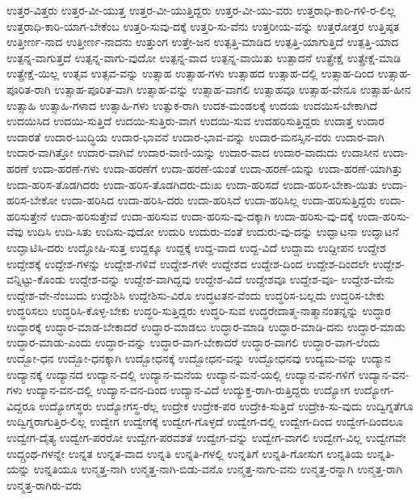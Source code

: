 {ಉತ್ತರ-ವಿತ್ತರು
ಉತ್ತರ-ವೀ-ಯುತ್ತ
ಉತ್ತರ-ವೀ-ಯುತ್ತಿದ್ದರು
ಉತ್ತರ-ವೀ-ಯು-ವರು
ಉತ್ತರಾಧಿ-ಕಾರಿ-ಗಳಿ-ರ-ಲಿಲ್ಲ
ಉತ್ತರಾಧಿ-ಕಾರಿ-ಯಾಗ-ಬೇಕೆಂಬ
ಉತ್ತರಿ-ಸುವು-ದಕ್ಕೆ
ಉತ್ತರಿ-ಸು-ವೆನು
ಉತ್ತರೀಯ-ವನ್ನು
ಉತ್ತರೋತ್ತರ
ಉತ್ತಿಷ್ಠತ
ಉತ್ತೀರ್ಣ-ನಾದ
ಉತ್ತೀರ್ಣ-ನಾದನು
ಉತ್ತುಂಗ
ಉತ್ತೇ-ಜನ
ಉತ್ಪತ್ತಿ-ಮಾಡಿದ
ಉತ್ಪತ್ತಿ-ಯಾಗುತ್ತಿದೆ
ಉತ್ಪತ್ತಿ-ಯಾದ
ಉತ್ಪನ್ನ-ವಾಗುತ್ತದೆ
ಉತ್ಪನ್ನ-ವಾಗು-ವುದೋ
ಉತ್ಪನ್ನ-ವಾದ
ಉತ್ಪನ್ನ-ವಾಯಿತು
ಉತ್ಪಾದನೆ
ಉತ್ಪ್ರೇಕ್ಷೆ
ಉತ್ಪ್ರೇಕ್ಷೆ-ಮಾಡಿ
ಉತ್ಪ್ರೇಕ್ಷೆ-ಯಿಲ್ಲ
ಉತ್ಸವ
ಉತ್ಸವ-ವನ್ನು
ಉತ್ಸಾಹ
ಉತ್ಸಾಹ-ಗಳು
ಉತ್ಸಾಹದ
ಉತ್ಸಾಹ-ದಲ್ಲಿ
ಉತ್ಸಾಹ-ದಿಂದ
ಉತ್ಸಾಹ-ಪೂರಿತ-ರಾಗಿ
ಉತ್ಸಾಹ-ಪೂರಿತ-ವಾಗಿ
ಉತ್ಸಾಹ-ವನ್ನು
ಉತ್ಸಾಹ-ವಾಗಲಿ
ಉತ್ಸಾಹವೂ
ಉತ್ಸಾಹ-ವೇನೂ
ಉತ್ಸಾಹ-ಹೀನ
ಉತ್ಸಾಹಿ
ಉತ್ಸಾಹಿ-ಗಳಾದ
ಉತ್ಸಾಹಿ-ಗಳು
ಉತ್ಸುಕ-ರಾಗಿ
ಉದಕ-ಮಂಡಲಕ್ಕೆ
ಉದಯ
ಉದಯಿಸ-ಬೇಕಾಗಿದೆ
ಉದಯಿಸಿದ
ಉದಯಿ-ಸುತ್ತಿದೆ
ಉದಯಿ-ಸುತ್ತಿರು-ವಾಗ
ಉದಯಿ-ಸುವ
ಉದಹರಿಸುತ್ತಿದ್ದರು
ಉದಾತ್ತ
ಉದಾರ
ಉದಾರತೆ
ಉದಾರ-ಬುದ್ಧಿಯ
ಉದಾರ-ಭಾವನೆ
ಉದಾರ-ಭಾವ-ವನ್ನು
ಉದಾರ-ಮನಸ್ಸಿನ-ವರು
ಉದಾರ-ವಾಗಿ
ಉದಾರ-ವಾಗಿತ್ತೋ
ಉದಾರ-ವಾಗಿವೆ
ಉದಾರ-ವಾಣಿ-ಯನ್ನು
ಉದಾರ-ವಾದ
ಉದಾರ-ವಾದುದು
ಉದಾಸೀನ
ಉದಾ-ಹರಣೆ
ಉದಾ-ಹರಣೆ-ಗಳು
ಉದಾ-ಹರಣೆಗೆ
ಉದಾ-ಹರಣೆ-ಯಂತೆ
ಉದಾ-ಹರಣೆ-ಯನ್ನು
ಉದಾ-ಹರಣೆ-ಯಾಗಿತ್ತು
ಉದಾ-ಹರಿಸ-ತೊಡಗಿದರು
ಉದಾ-ಹರಿಸ-ತೊಡಗಿದರು-ದುಃಖ
ಉದಾ-ಹರಿಸದೆ
ಉದಾ-ಹರಿಸ-ಬೇಕಾ-ಯಿತು
ಉದಾ-ಹರಿಸ-ಬೇಕೋ
ಉದಾ-ಹರಿಸಿದ
ಉದಾ-ಹರಿಸಿ-ದರು
ಉದಾ-ಹರಿಸಿದೆ
ಉದಾ-ಹರಿಸಿಲ್ಲ
ಉದಾ-ಹರಿಸುತ್ತಿದ್ದರು
ಉದಾ-ಹರಿಸುತ್ತೇನೆ
ಉದಾ-ಹರಿಸುತ್ತೇವೆ
ಉದಾ-ಹರಿಸುವ
ಉದಾ-ಹರಿಸು-ವು-ದಕ್ಕಾಗಿ
ಉದಾ-ಹರಿಸು-ವು-ದಕ್ಕೆ
ಉದಾ-ಹರಿಸು-ವೆವು
ಉದಿಸಿ
ಉದಿ-ಸಿತು
ಉದಿಸು-ವುದೋ
ಉದುರಿ
ಉದುರು-ವಂತೆ
ಉದುರು-ವು-ದನ್ನು
ಉದ್ಘಾಟನಾ
ಉದ್ಘಾಟನೆ
ಉದ್ಘಾಟಿಸಿ-ದರು
ಉದ್ಘೋಷಿ-ಸುತ್ತ
ಉದ್ದಕ್ಕೂ
ಉದ್ದಕ್ಕೆ
ಉದ್ದ-ವಾದ
ಉದ್ದ-ವಿದೆ
ಉದ್ದಾಮ
ಉದ್ದೀಪನ
ಉದ್ದೇಶ
ಉದ್ದೇಶಕ್ಕೆ
ಉದ್ದೇಶ-ಗಳನ್ನು
ಉದ್ದೇಶ-ಗಳಿವೆ
ಉದ್ದೇಶ-ಗಳೇ
ಉದ್ದೇಶದ
ಉದ್ದೇಶ-ದಿಂದ
ಉದ್ದೇಶ-ದಿಂದಲೇ
ಉದ್ದೇಶ-ವನ್ನಿಟ್ಟು-ಕೊಂಡು
ಉದ್ದೇಶ-ವನ್ನು
ಉದ್ದೇಶ-ವಾಗಿದ್ದವು
ಉದ್ದೇಶ-ವಿದೆ
ಉದ್ದೇಶವೂ
ಉದ್ದೇಶ-ವೂ-
ಉದ್ದೇಶ-ವೇನು
ಉದ್ದೇಶ-ವೇ-ನೆಂಬುದು
ಉದ್ದೇಶಿಸಿ
ಉದ್ದೇಶಿಸು-ವಿರೊ
ಉದ್ಧಟತನ-ವೆಂದು
ಉದ್ಧರಿಸ-ಬಲ್ಲದು
ಉದ್ಧರಿಸ-ಬೇಕು
ಉದ್ಧರಿಸಲು
ಉದ್ಧರಿಸಿ-ಕೊಳ್ಳ-ಬೇಕು
ಉದ್ಧರಿ-ಸುತ್ತಿದ್ದರು
ಉದ್ಧರಿ-ಸುವ
ಉದ್ಧರೇದಾತ್ಮ-ನಾತ್ಮಾನಂತನ್ನನ್ನು
ಉದ್ಧಾರ
ಉದ್ಧಾರಕ್ಕೆ
ಉದ್ಧಾರ-ಮಾಡ-ಬೇಕಾದರೆ
ಉದ್ಧಾರ-ಮಾಡಲು
ಉದ್ಧಾರ-ಮಾಡಿ
ಉದ್ಧಾರ-ಮಾಡಿ-ದನು
ಉದ್ಧಾರ-ಮಾಡು
ಉದ್ಧಾರ-ಮಾಡು-ಎಂದು
ಉದ್ಧಾರ-ವನ್ನು
ಉದ್ಧಾರ-ವಾಗ-ಬೇಕಾದರೆ
ಉದ್ಧಾರ-ವಾಗಲಿ
ಉದ್ಧಾರ-ವಾಗ-ಲೆಂದು
ಉದ್ಬೋ-ಧನ
ಉದ್ಬೋ-ಧನಕ್ಕಾಗಿ
ಉದ್ಬೋಧನಕ್ಕೆ
ಉದ್ಬೋಧನ-ವನ್ನು
ಉದ್ಬೋಧನವು
ಉದ್ಯಮ-ವನ್ನು
ಉದ್ಯಾನ
ಉದ್ಯಾನಕ್ಕೆ
ಉದ್ಯಾನದ
ಉದ್ಯಾನ-ದಲ್ಲಿ
ಉದ್ಯಾನ-ಮನೆಯ
ಉದ್ಯಾನ-ಮನೆ-ಯಲ್ಲಿ
ಉದ್ಯಾನ-ವನ-ಗಳಿಗೆ
ಉದ್ಯಾನ-ವನ-ಗಳು
ಉದ್ಯಾನ-ವನ-ದಲ್ಲಿ
ಉದ್ಯಾನ-ವನ-ದಿಂದ
ಉದ್ಯಾನ-ವಿದೆ
ಉದ್ಯುಕ್ತ-ರಾಗಿ-ರುತ್ತಿದ್ದರು
ಉದ್ಯೋಗ
ಉದ್ಯೋಗ-ವಿದ್ದರೂ
ಉದ್ಯೋಗಸ್ಥರು
ಉದ್ಯೋಗಸ್ಥ-ರೆಲ್ಲ
ಉದ್ರೇಕ
ಉದ್ರೇಕ-ಪರ
ಉದ್ರೇಕಿ-ಸುತ್ತಿದೆ
ಉದ್ರೇಕಿ-ಸು-ವುದು
ಉದ್ವಿಗ್ನತೆಗೂ
ಉದ್ವಿಗ್ನರಾಗುತ್ತಿರ-ಲಿಲ್ಲ
ಉದ್ವೇಗ
ಉದ್ವೇಗಕ್ಕೆ
ಉದ್ವೇಗ-ಗೊಳ್ಳದೆ
ಉದ್ವೇಗ-ದಲ್ಲಿ
ಉದ್ವೇಗ-ದಿಂದ
ಉದ್ವೇಗ-ದಿಂದಲೂ
ಉದ್ವೇಗ-ದೈತ್ಯ
ಉದ್ವೇಗ-ಪರರೋ
ಉದ್ವೇಗ-ಪರವಶತೆ
ಉದ್ವೇಗ-ವನ್ನು
ಉದ್ವೇಗ-ವಾಗಲಿ
ಉದ್ವೇಗ-ವಿಲ್ಲ
ಉದ್ವೇಗವೇ
ಉದ್ಗ್ರಂಥ-ಗಳನ್ನೇ
ಉನ್ನತ
ಉನ್ನತ-ವಾದ
ಉನ್ನತಿ
ಉನ್ನತಿ-ಗಳಲ್ಲಿ
ಉನ್ನತಿಗೆ
ಉನ್ನತಿ-ಗೋಸುಗ
ಉನ್ನತಿಯ
ಉನ್ನತಿ-ಯನ್ನು
ಉನ್ನತಿಯೂ
ಉನ್ಮತ್ತ-ನಾಗಿ
ಉನ್ಮತ್ತ-ನಾಗಿ-ಬಿಡು-ವನೊ
ಉನ್ಮತ್ತ-ನಾಗು-ವನು
ಉನ್ಮತ್ತ-ರನ್ನಾಗಿ
ಉನ್ಮತ್ತ-ರಾಗಿ
ಉನ್ಮತ್ತ-ರಾಗಿರು-ವರು
}
